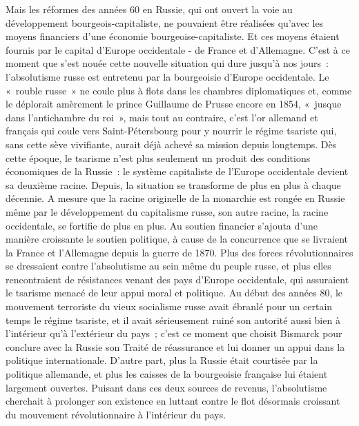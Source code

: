 \documentclass[french,twoside]{book} %
\begin{document}
Mais les réformes des années 60 en Russie, qui ont ouvert la voie au développement bourgeois-capitaliste, ne pouvaient être réalisées qu’avec les moyens financiers d’une économie bourgeoise-capitaliste. Et ces moyens étaient fournis par le capital d’Europe occidentale - de France et d’Allemagne. C'est à ce moment que s’est nouée cette nouvelle situation qui dure jusqu’à nos jours : l’absolutisme russe est entretenu par la bourgeoisie d’Europe occidentale. Le « rouble russe » ne coule plus à flots dans les chambres diplomatiques et, comme le déplorait amèrement le prince Guillaume de Prusse encore en 1854, « jusque dans l’antichambre du roi », mais tout au contraire, c’est l’or allemand et français qui coule vers Saint-Pétersbourg pour y nourrir le régime tsariste qui, sans cette sève vivifiante, aurait déjà achevé sa mission depuis longtemps. Dès cette époque, le tsarisme n’est plus seulement un produit des conditions économiques de la Russie : le système capitaliste de l’Europe occidentale devient sa deuxième racine. Depuis, la situation se transforme de plus en plus à chaque décennie. A mesure que la racine originelle de la monarchie est rongée en Russie même par le développement du capitalisme russe, son autre racine, la racine occidentale, se fortifie de plus en plus. Au soutien financier s’ajouta d’une manière croissante le soutien politique, à cause de la concurrence que se livraient la France et l’Allemagne depuis la guerre de 1870. Plus des forces révolutionnaires se dressaient contre l’absolutisme au sein même du peuple russe, et plus elles rencontraient de résistances venant des pays d’Europe occidentale, qui assuraient le tsarisme menacé de leur appui moral et politique. Au début des années 80, le mouvement terroriste du vieux socialisme russe avait ébranlé pour un certain temps le régime tsariste, et il avait sérieusement ruiné son autorité aussi bien à l’intérieur qu’à l’extérieur du pays ; c’est ce moment que choisit Bismarck pour conclure avec la Russie son Traité de réassurance et lui donner un appui dans la politique internationale. D'autre part, plus la Russie était courtisée par la politique allemande, et plus les caisses de la bourgeoisie française lui étaient largement ouvertes. Puisant dans ces deux sources de revenus, l’absolutisme cherchait à prolonger son existence en luttant contre le flot désormais croissant du mouvement révolutionnaire à l’intérieur du pays.\par
\end{document}
